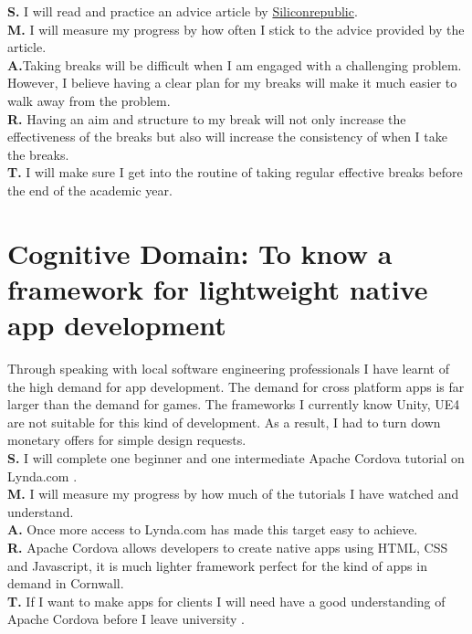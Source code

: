 \documentclass{scrartcl}
\begin{document}
{\textbf{S.} I will read and practice an advice article by \href{https://www.siliconrepublic.com/advice/work-breaks-stress-productivity}{Siliconrepublic}.\\
\textbf{M.} I will measure my progress by how often I stick to the advice provided by the article.\\
\textbf{A.}Taking breaks will be difficult when I am engaged with a challenging problem. However, I believe having a clear plan for my breaks will make it much easier to walk away from the problem.\\
\textbf{R.} Having an aim and structure to my break will not only increase the effectiveness of the breaks but also will increase the consistency of when I take the breaks. \\
\textbf{T.} I will make sure I get into the routine of taking regular effective breaks before the end of the academic year. 

\section{Cognitive Domain: To know a framework for lightweight native app development}
 Through speaking with local software engineering professionals I have learnt of the high demand for app development. The demand for cross platform apps is far larger than the demand for games. The frameworks I currently know Unity, UE4  are not suitable for this kind of development. As a result, I had to turn down monetary offers for simple design requests. \\
\textbf{S.} I will complete one beginner and one intermediate Apache Cordova tutorial on Lynda.com .\\
\textbf{M.} I will measure my progress by how much of the tutorials I have watched and understand.\\
\textbf{A.} Once more access to Lynda.com has made this target easy to achieve.\\
\textbf{R.} Apache Cordova allows developers to create native apps using HTML, CSS and Javascript, it is much lighter framework perfect for the kind of apps in demand in Cornwall.\\
\textbf{T.} If I want to make apps for clients I will need have a good understanding of Apache Cordova before I leave university . \\


}
\end{document}
